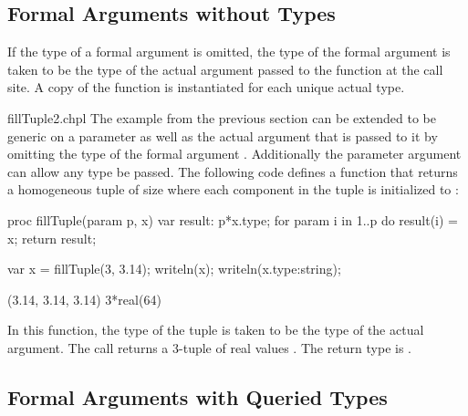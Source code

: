 \subsection{Formal Arguments without Types}
\label{Formal_Arguments_without_Types}

If the type of a formal argument is omitted, the type of the formal
argument is taken to be the type of the actual argument passed to the
function at the call site.  A copy of the function is instantiated for
each unique actual type.
\begin{chapelexample}{fillTuple2.chpl}
The example from the previous section can be extended to be generic on
a parameter as well as the actual argument that is passed to it by
omitting the type of the formal argument .  Additionally
the parameter argument can allow any type be passed. The following code
defines a function that returns a homogeneous tuple of size 
where each component in the tuple is initialized to :
\begin{chapel}
proc fillTuple(param p, x) {
  var result: p*x.type;
  for param i in 1..p do
    result(i) = x;
  return result;
}
\end{chapel}
\begin{chapelpost}
var x = fillTuple(3, 3.14);
writeln(x);
writeln(x.type:string);
\end{chapelpost}
\begin{chapeloutput}
(3.14, 3.14, 3.14)
3*real(64)
\end{chapeloutput}
In this function, the type of the tuple is taken to be the type of the
actual argument.  The call  returns a 3-tuple
of real values .  The return type is
.
\end{chapelexample}

\subsection{Formal Arguments with Queried Types}
\label{Formal_Arguments_with_Queried_Types}

